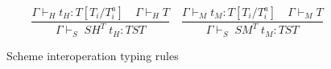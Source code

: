 \begin{figure}
\[
\frac{\Gamma\vdash_{H}t_{H}:T[T_{i}/T^{a}_{i}]\quad\Gamma\vdash_{H}T}{\Gamma\vdash_{S}\;SH^{T}\;t_{H}:TST}
\quad
\frac{\Gamma\vdash_{M}t_{M}:T[T_{i}/T^{a}_{i}]\quad\Gamma\vdash_{M}T}{\Gamma\vdash_{S}\;SM^{T}\;t_{M}:TST}
\]
\caption{Scheme interoperation typing rules}
\label{sitr}
\end{figure}